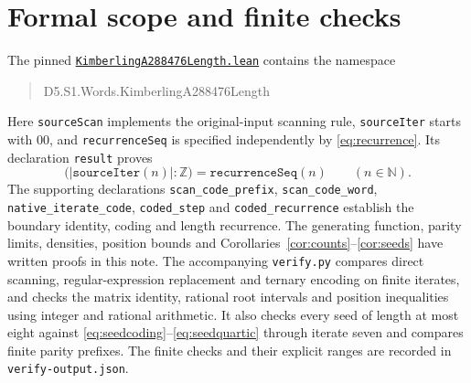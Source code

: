 \documentclass[11pt]{article}
\begin{document}
\section{Formal scope and finite checks}
The pinned \href{https://github.com/the-omega-institute/trureturing/blob/79dfe4f731baccd42dd3c56cf6331a0ddd3cafdb/D5/S1/Words/KimberlingA288476Length.lean}{\texttt{KimberlingA288476Length.lean}}
contains the namespace
\begin{quote}\ttfamily D5.S1.Words.KimberlingA288476Length\end{quote}
Here \texttt{sourceScan} implements the original-input scanning rule,
\texttt{sourceIter} starts with $00$, and
\texttt{recurrenceSeq} is specified independently by \eqref{eq:recurrence}.
Its declaration \texttt{result} proves
\[
\bigl(|\texttt{sourceIter}(n)|:\mathbb Z\bigr)
   =\texttt{recurrenceSeq}(n)\qquad(n\in\mathbb N).
\]
The supporting declarations \texttt{scan\_code\_prefix},
\texttt{scan\_code\_word}, \texttt{native\_iterate\_code},
\texttt{coded\_step} and \texttt{coded\_recurrence} establish the
boundary identity, coding and length recurrence.
The generating function, parity limits, densities, position bounds
and Corollaries~\ref{cor:counts}--\ref{cor:seeds} have written proofs
in this note. The accompanying
\texttt{verify.py} compares direct scanning, regular-expression
replacement and ternary encoding on finite iterates, and checks the
matrix identity, rational root intervals and position inequalities
using integer and rational arithmetic. It also checks every seed
of length at most eight against \eqref{eq:seedcoding}--\eqref{eq:seedquartic}
through iterate seven and compares finite parity prefixes.
The finite checks and their
explicit ranges are recorded in \texttt{verify-output.json}.
\end{document}
